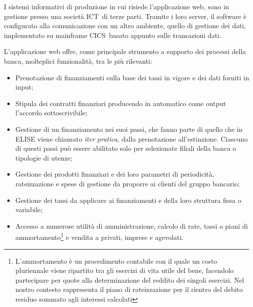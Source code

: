 	I sistemi informativi di produzione in cui risiede l'applicazione web, sono in gestione presso una società ICT\glossario\ di terze parti. Tramite i loro server, il software è configurato alla comunicazione con un altro ambiente, quello di gestione dei dati, implementato su mainframe CICS\glossario\ basato appunto sulle transazioni dati.
		
	
	L'applicazione web offre, come principale strumento a supporto dei processi della banca, molteplici funzionalità, tra le più rilevanti:
	
	\begin{itemize}
		\item Prenotazione di finanziamenti sulla base dei tassi in vigore e dei dati forniti in input;
		\item Stipula dei contratti finanziari producendo in automatico come output l'accordo sottoscrivibile;
		\item Gestione di un finanziamento nei suoi passi, che fanno parte di quello che in ELISE viene chiamato \textit{iter pratica}, dalla prenotazione all'estinzione. Ciascuno di questi passi può essere abilitato solo per selezionate filiali della banca o tipologie di utenze;
		\item Gestione dei prodotti finanziari e dei loro parametri di periodicità, rateizzazione e spese di gestione da proporre ai clienti del gruppo bancario;
		\item Gestione dei tassi da applicare ai finanziamenti e della loro struttura fissa o variabile;
		\item Accesso a numerose utilità di amministrazione, calcolo di rate, tassi o piani di ammortamento\footnote{L'ammortamento è un procedimento contabile con il quale un costo pluriennale viene ripartito tra gli esercizi di vita utile del bene, facendolo partecipare per quote alla determinazione del reddito dei singoli esercizi. Nel nostro contesto rappresenta il piano di rateizzazione per il rientro del debito residuo sommato agli interessi calcolati} e vendita a privati, imprese e agevolati.	
	\end{itemize}
		

